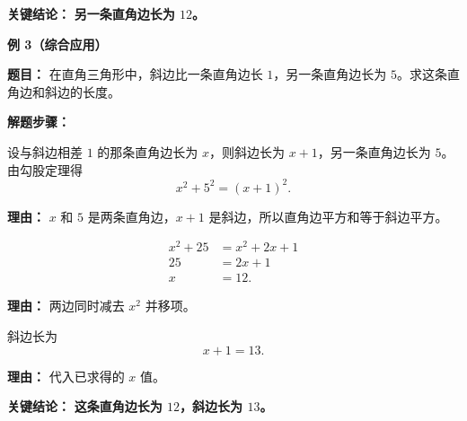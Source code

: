 \begin{examplebox}
	\textbf{\textcolor{CExample}{关键结论：}} \textbf{另一条直角边长为 $12$。}

	\medskip
	\textbf{\textcolor{CExample}{例 3（综合应用）}}

	\textbf{\textcolor{CExample}{题目：}} 在直角三角形中，斜边比一条直角边长 $1$，另一条直角边长为 $5$。求这条直角边和斜边的长度。

	\textbf{\textcolor{CExample}{解题步骤：}}
	\begin{description}[style=nextline, leftmargin=2.8em, labelsep=0.5em, itemsep=0.45em]
		\item[\textbf{第一步（设未知数列方程）：}] 设与斜边相差 $1$ 的那条直角边长为 $x$，则斜边长为 $x+1$，另一条直角边长为 $5$。由勾股定理得
		      \[
			      x^2 + 5^2 = (x+1)^2.
		      \]
		      \par\textbf{理由：}
		      $x$ 和 $5$ 是两条直角边，$x+1$ 是斜边，所以直角边平方和等于斜边平方。

		\item[\textbf{第二步（展开并解方程）：}]
		      \[
			      \begin{aligned}
				      x^2 + 25 & = x^2 + 2x + 1 \\
				      25       & = 2x + 1       \\
				      x        & = 12.
			      \end{aligned}
		      \]
		      \par\textbf{理由：}
		      两边同时减去 $x^2$ 并移项。

		\item[\textbf{第三步（求斜边长）：}] 斜边长为
		      \[
			      x+1 = 13.
		      \]
		      \par\textbf{理由：}
		      代入已求得的 $x$ 值。
	\end{description}

	\textbf{\textcolor{CExample}{关键结论：}} \textbf{这条直角边长为 $12$，斜边长为 $13$。}
\end{examplebox}